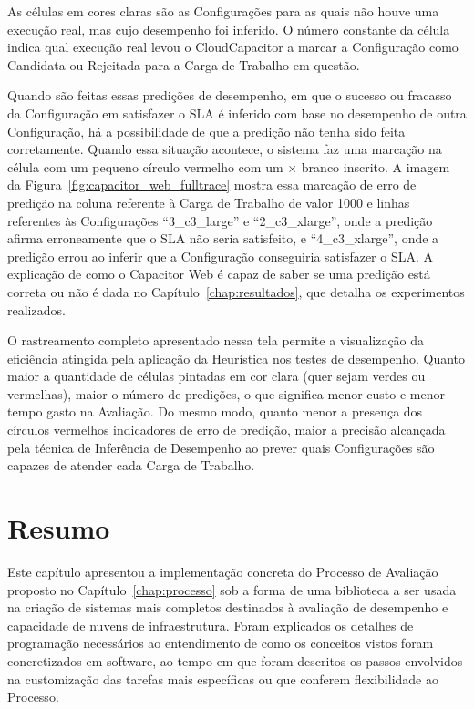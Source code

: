 As células em cores claras são as Configurações para as quais não houve uma execução
real, mas cujo desempenho foi inferido. O número constante da célula indica qual
execução real levou o CloudCapacitor a marcar a Configuração como Candidata ou 
Rejeitada para a Carga de Trabalho em questão.

Quando são feitas essas predições de desempenho, em que o sucesso ou fracasso
da Configuração em satisfazer o SLA é inferido com base no desempenho de outra
Configuração, há a possibilidade de que a predição não tenha sido feita corretamente.
Quando essa situação acontece, o sistema faz uma marcação na célula com um pequeno
círculo vermelho com um $\times$ branco inscrito. A imagem da 
Figura~\ref{fig:capacitor_web_fulltrace} mostra essa marcação de erro de predição
na coluna referente à Carga de Trabalho de valor 1000 e linhas referentes às
Configurações ``3\_c3\_large'' e ``2\_c3\_xlarge'', onde a predição afirma erroneamente
que o SLA não seria satisfeito, e ``4\_c3\_xlarge'', onde a predição errou ao inferir 
que a Configuração conseguiria satisfazer o SLA. A explicação de como o Capacitor Web 
é capaz de saber se uma predição está correta ou não é dada no Capítulo~\ref{chap:resultados},
que detalha os experimentos realizados.

O rastreamento completo apresentado nessa tela permite a visualização da eficiência atingida
pela aplicação da Heurística nos testes de desempenho. Quanto maior a quantidade
de células pintadas em cor clara (quer sejam verdes ou vermelhas), maior o número
de predições, o que significa menor custo e menor tempo gasto na Avaliação. Do mesmo 
modo, quanto menor a presença dos círculos vermelhos indicadores de erro de predição,
maior a precisão alcançada pela técnica de Inferência de Desempenho ao prever quais
Configurações são capazes de atender cada Carga de Trabalho.

\section{Resumo}
Este capítulo apresentou a implementação concreta do Processo de Avaliação proposto no
Capítulo~\ref{chap:processo} sob a forma de uma biblioteca a ser usada na criação de sistemas
mais completos destinados à avaliação de desempenho e capacidade de nuvens de infraestrutura.
Foram explicados os detalhes de programação necessários ao entendimento de como os conceitos vistos
foram concretizados em software, ao tempo em que foram descritos os passos envolvidos na 
customização das tarefas mais específicas ou que conferem flexibilidade ao Processo.

